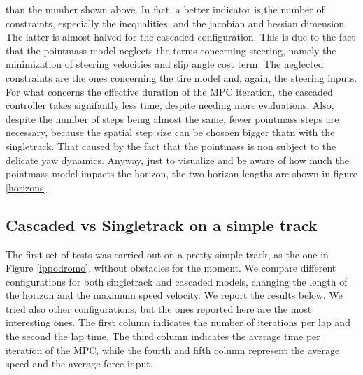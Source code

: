 \documentclass[a4paper, onecolumn, 12pt]{article}
\begin{document}
than the number shown above. In fact, a better indicator is the number of
constraints, especially the inequalities, and the jacobian and hessian
dimension. The latter is almost halved for the cascaded configuration. This is
due to the fact that the pointmass model neglects the terms concerning steering,
namely the minimization of steering velocities and slip angle cost term. The
neglected constraints are the ones concerning the tire model and, again, the
steering inputs. For what concerns the effective duration of the MPC iteration,
the cascaded controller takes signifantly less time, despite needing more
evaluations. Also, despite the number of steps being almost the same, fewer
pointmass steps are necessary, because the spatial step size can be chosoen
bigger thatn with the singletrack. That caused by the fact that the pointmass is
non subject to the delicate yaw dynamics. Anyway, just to visualize and be aware
of how much the pointmass model impacts the horizon, the two horizon lengths are
shown in figure \ref{horizons}.

\subsection{Cascaded vs Singletrack on a simple track}

The first set of tests was carried out on a pretty simple track, as the one in Figure
\ref{ippodromo}, without obstacles for the moment. We compare different configurations
for both singletrack and cascaded models, changing the length of the horizon and the 
maximum speed velocity. We report the results below. We tried also other configurations,
but the ones reported here are the most interesting ones. The
first column indicates the number of iterations per lap and the second the lap
time. The third column indicates the average time per iteration of the MPC,
while the fourth and fifth column represent the average speed and the average
force input.
\end{document}
